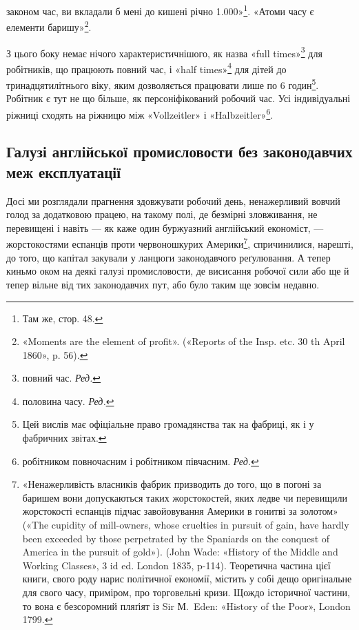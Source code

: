 \parcont{}  %
законом час, ви вкладали б мені до кишені річно \num{1.000}»\footnote{
Там же, стор. 48.
}. «Атоми часу є елементи баришу»\footnote{
«Moments are the element of profit». («Reports of the Insp. etc.
30 th April 1860», p. 56).
}.

З цього боку немає нічого характеристичнішого, як назва
«\textenglish{full times}»\footnote*{
повний час. \emph{Ред.}
} для робітників, що працюють повний час, і «half
times»\footnote*{
половина часу. \emph{Ред.}
} для дітей до тринадцятилітнього віку, яким дозволяється
працювати лише по 6 годин\footnote{
Цей вислів має офіціальне право громадянства так на фабриці,
як і у фабричних звітах.
}. Робітник є тут не що більше,
як персоніфікований робочий час. Усі індивідуальні ріжниці
сходять на ріжницю між «Vollzeitler» і «Halbzeitler»\footnote*{
робітником повночасним і робітником півчасним. \emph{Ред.}
}.

\subsection{Галузі англійської промисловости без законодавчих меж
експлуатації}

Досі ми розглядали прагнення здовжувати робочий день,
ненажерливий вовчий голод за додатковою працею, на такому
полі, де безмірні зловживання, не перевищені і навіть — як каже
один буржуазний англійський економіст, — жорстокостями еспанців
проти червоношкурих Америки\footnote{
«Ненажерливість власників фабрик призводить до того, що в погоні
за баришем вони допускаються таких жорстокостей, яких ледве чи
перевищили жорстокості еспанців підчас завойовування Америки в гонитві
за золотом» («The cupidity of mill-owners, whose cruelties in pursuit
of gain, have hardly been exceeded by those perpetrated by the Spaniards
on the conquest of America in the pursuit of gold»). (John Wade:
«History of the Middle and Working Classes», 3 id ed. London 1835, p-114).
Теоретична частина цієї книги, свого роду нарис політичної економії,
містить у собі дещо оригінальне для свого часу, приміром, про торговельні
кризи. Щождо історичної частини, то вона є безсоромний пляґіят із Sir
М.~Eden: «History of the Poor», London 1799.
}, спричинилися, нарешті,
до того, що капітал закували у ланцюги законодавчого реґулювання.
А тепер киньмо оком на деякі галузі промисловости, де
висисання робочої сили або ще й тепер вільне від тих законодавчих
пут, або було таким ще зовсім недавно.

